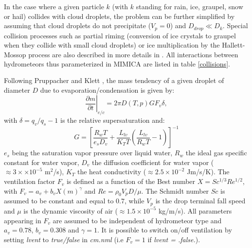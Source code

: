 \documentclass[12pt,A4,french]{article}
\begin{document}
\begin{description}
In the case where a given particle $k$ (with $k$ standing for rain, ice, graupel, snow or hail) collides with cloud droplets, the problem can be further simplified by assuming that cloud droplets do not precipitate ($V_p = 0$) and $D_{drop} \ll D_{k}$. Special collision processes such as partial riming (conversion of ice crystals to graupel when they collide with small cloud droplets) or ice multiplication by the Hallett-Mossop process are also described in more details in \cite{SB2006}. All interactions between hydrometeors thus parameterized in MIMICA are listed in table \ref{collisions}. 

Following Pruppacher and Klett \cite{PK1997}, the mass tendency of a given droplet of diameter $D$ due to evaporation/condensation is given by:
\begin{equation}
\left.\frac{\partial m}{\partial t}\right|_{e/c} = 2\pi D \left(T,p\right) G F_{v} \delta,
\label{evap}
\end{equation}
with $\delta = q_{v}/q_{s} - 1$ is the relative supersaturation and:
\begin{equation}
    G = \left[\frac{R_{w} T}{e_{s} D_{v}} + \frac{L_{lv}}{K_{T} T}\left(\frac{L_{lv}}{R_{w} T}-1\right)\right]^{-1}
    \label{G}
\end{equation}
$e_{s}$ being the saturation vapor pressure over liquid water, $R_{w}$ the ideal gas specific constant for water vapor, $D_{v}$ the diffusion coefficient for water vapor ($\approx 3\times \times 10^{-5}$ m$^2$/s), $K_{T}$ the heat conductivity ($\approx 2.5\times 10^{-2}$ Jm/s/K). The ventilation factor $F_{v}$ is defined as a function of the Best number $X = Sc^{1/3}Re^{1/2}$, with $F_{v} = a_{v} + b_{v} X\left(m\right)^{\gamma}$ and $Re = \rho_{0} V_{p} D / \mu$. The Schmidt number $Sc$ is assumed to be constant and equal to $0.7$, while $V_{p}$ is the drop terminal fall speed and $\mu$ is the dynamic viscosity of air ($\approx 1.5\times 10^{-5}$ kg/m/s). All parameters appearing in $F_v$ are assumed to be independent of hydrometeor type and $a_{v}=0.78$, $b_{v}=0.308$ and $\gamma=1$. It is possible to switch on/off ventilation by setting {\it lvent} to {\it true/false} in {\it cm.nml} (i.e $F_v = 1$ if {\it lvent = .false.}).


\end{description}
\end{document}

